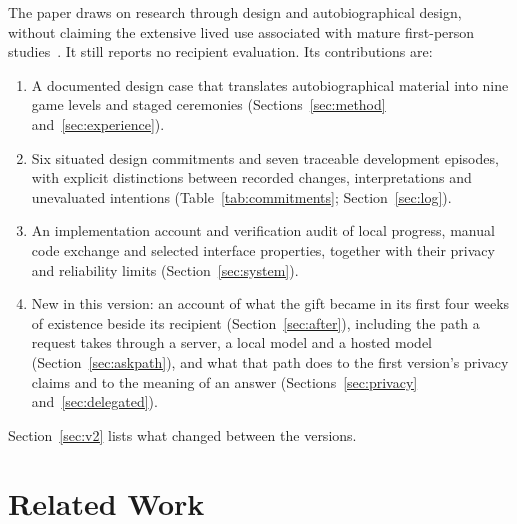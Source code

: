 \documentclass[sigconf,nonacm]{acmart}
\begin{document}
The paper draws on research through design and autobiographical design, without claiming the
extensive lived use associated with mature first-person
studies~\cite{zimmerman2007rtd,gaver2012expect,neustaedter2012autobiographical}. It still reports
no recipient evaluation. Its contributions are:
\begin{enumerate}[leftmargin=*,itemsep=2pt,topsep=2pt]
  \item A documented design case that translates autobiographical material into nine game levels
  and staged ceremonies (Sections~\ref{sec:method} and~\ref{sec:experience}).
  \item Six situated design commitments and seven traceable development episodes, with explicit
  distinctions between recorded changes, interpretations and unevaluated intentions
  (Table~\ref{tab:commitments}; Section~\ref{sec:log}).
  \item An implementation account and verification audit of local progress, manual code exchange
  and selected interface properties, together with their privacy and reliability limits
  (Section~\ref{sec:system}).
  \item New in this version: an account of what the gift became in its first four weeks of
  existence beside its recipient (Section~\ref{sec:after}), including the path a request takes
  through a server, a local model and a hosted model (Section~\ref{sec:askpath}), and what that
  path does to the first version's privacy claims and to the meaning of an answer
  (Sections~\ref{sec:privacy} and~\ref{sec:delegated}).
\end{enumerate}
Section~\ref{sec:v2} lists what changed between the versions.


\section{Related Work}
\end{document}
